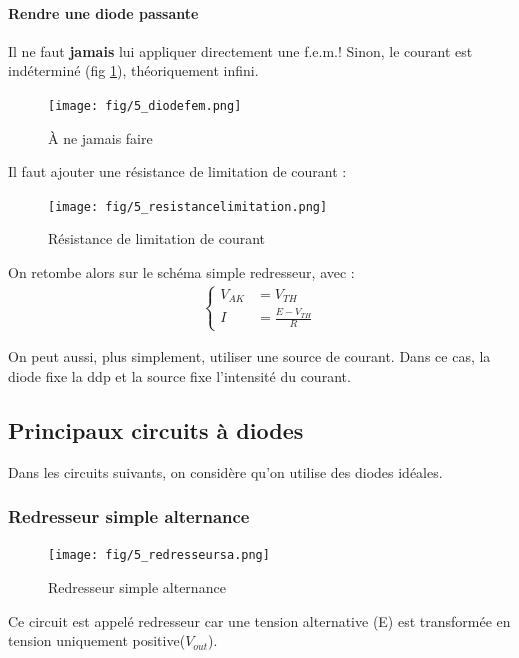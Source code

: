 \documentclass[a4paper]{article}
\begin{document}
    \paragraph{Rendre une diode passante}
    Il ne faut \textbf{jamais} lui appliquer directement une f.e.m.! Sinon, 
    le courant est indéterminé (fig \ref{fig:5_diodefem}), théoriquement infini.
    \begin{figure}[H]
        \begin{center}
            \texttt{[image: fig/5\_diodefem.png]}
            \caption{\`A ne jamais faire}
            \label{fig:5_diodefem}
        \end{center}
    \end{figure}

    Il faut ajouter une résistance de limitation de courant :
    \begin{figure}[H]
        \begin{center}
            \texttt{[image: fig/5\_resistancelimitation.png]}
            \caption{Résistance de limitation de courant}
            \label{fig:5_resistancelimitation}
        \end{center}
    \end{figure}
    On retombe alors sur le schéma simple redresseur, avec :
    \begin{align*}
        \begin{cases}
            V_{AK} &= V_{TH}\\
            I &=\frac{E-V_{TH}}{R}
        \end{cases}
    \end{align*}

    On peut aussi, plus simplement, utiliser une source de courant. Dans ce cas, 
    la diode fixe la ddp et la source fixe l'intensité du courant.

    \subsection{Principaux circuits à diodes}
    Dans les circuits suivants, on considère qu'on utilise des diodes idéales.

    \subsubsection{Redresseur simple alternance}
    \begin{figure}[H]
        \begin{center}
            \texttt{[image: fig/5\_redresseursa.png]}
            \caption{Redresseur simple alternance}
            \label{fig:5_redresseursa}
        \end{center}
    \end{figure}
    Ce circuit est appelé redresseur car une tension alternative (E) est transformée
    en tension uniquement positive($V_{out}$).\\
\end{document}
